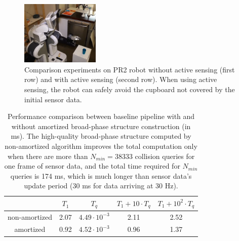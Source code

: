 \begin{figure}[t]
  \includegraphics[height=1.2in]{figs/8/succ4.png}
  \caption[Comparison experiments on PR2 robot without and with active sensing]{\label{fig:8:actualPR2} Comparison experiments on PR2 robot without active sensing (first row) and with active sensing (second row). When using active sensing, the robot can safely avoid the cupboard not covered by the initial sensor data.}
\end{figure}


\begin{table}[htbp]
\centering
\begin{tabular}{c|c c | c c}
 & $T_1$ & $T_q$ & $T_1 + 10 \cdot T_q$ & $T_1 + 10^2 \cdot T_q$ \\\hline
non-amortized & 2.07 & $4.49\cdot 10^{-3}$ & 2.11 & 2.52 \\
amortized & 0.92 & $4.52 \cdot 10^{-3}$ & 0.96 & 1.37 \\
\end{tabular}
\caption[Performance comparison between pipelines with and without amortized broad-phase structure construction]{Performance comparison between baseline pipeline with and without amortized broad-phase structure construction (in ms). The high-quality broad-phase structure computed by non-amortized algorithm improves the total computation only when there are more than $N_{min} = 38333$ collision queries for one frame of sensor data, and the total time required for $N_{min}$ queries is 174 ms, which is much longer than sensor data's update period ($30$ ms for data arriving at 30 Hz).
\label{table:8:amortized}
}
\end{table}

